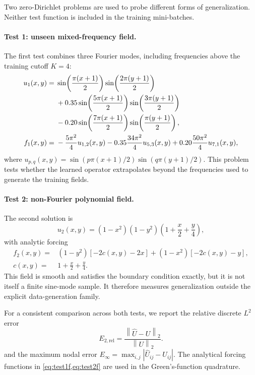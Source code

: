 \documentclass[11pt,a4paper]{article}
\newcommand{\norm}[1]{\left\lVert #1\right\rVert}
\begin{document}
Two zero-Dirichlet problems are used to probe different forms of generalization. Neither test function is included in the training mini-batches.

\paragraph{Test 1: unseen mixed-frequency field.}
The first test combines three Fourier modes, including frequencies above the training cutoff $K=4$:
\begin{align}
  u_1(x,y)={}&
  \sin\!\left(\frac{\pi(x+1)}{2}\right)
  \sin\!\left(\frac{2\pi(y+1)}{2}\right) \notag\\
  &+0.35\sin\!\left(\frac{5\pi(x+1)}{2}\right)
  \sin\!\left(\frac{3\pi(y+1)}{2}\right) \notag\\
  &-0.20\sin\!\left(\frac{7\pi(x+1)}{2}\right)
  \sin\!\left(\frac{\pi(y+1)}{2}\right),
  \label{eq:test1u}\\
  f_1(x,y)={}&
  -\frac{5\pi^2}{4}u_{1,2}(x,y)
  -0.35\frac{34\pi^2}{4}u_{5,3}(x,y)
  +0.20\frac{50\pi^2}{4}u_{7,1}(x,y),
  \label{eq:test1f}
\end{align}
where $u_{p,q}(x,y)=\sin(p\pi(x+1)/2)\sin(q\pi(y+1)/2)$. This problem tests whether the learned operator extrapolates beyond the frequencies used to generate the training fields.

\paragraph{Test 2: non-Fourier polynomial field.}
The second solution is
\begin{equation}
  u_2(x,y)=(1-x^2)(1-y^2)\left(1+\frac{x}{2}+\frac{y}{4}\right),
  \label{eq:test2u}
\end{equation}
with analytic forcing
\begin{align}
  f_2(x,y)={}&(1-y^2)\left[-2c(x,y)-2x\right]
  +(1-x^2)\left[-2c(x,y)-y\right],\label{eq:test2f}\\
  c(x,y)={}&1+\frac{x}{2}+\frac{y}{4}.
\end{align}
This field is smooth and satisfies the boundary condition exactly, but it is not itself a finite sine-mode sample. It therefore measures generalization outside the explicit data-generation family.

For a consistent comparison across both tests, we report the relative discrete $L^2$ error
\begin{equation}
  E_{2,\mathrm{rel}}=
  \frac{\norm{\widehat{U}-U}_2}{\norm{U}_2}.
  \label{eq:relativeL2}
\end{equation}
and the maximum nodal error $E_\infty=\max_{i,j}|\widehat{U}_{ij}-U_{ij}|$. The analytical forcing functions in \cref{eq:test1f,eq:test2f} are used in the Green's-function quadrature.
\end{document}
